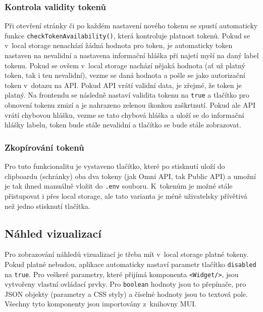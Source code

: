 \documentclass[czech, bc, kiv, he, iso690numb, viewonly]{fasthesis} %
\begin{document}
\subsubsection{Kontrola validity tokenů}

Při otevření stránky či po každém nastavení nového tokenu se spustí automaticky funkce \texttt{checkTokenAvailability()}, která kontroluje platnost tokenů. Pokud se v~local storage nenachází
žádná hodnota pro token, je automaticky token nastaven na nevalidní a nastavena informační hláška při najetí myší na daný label tokenu. Pokud se ovšem v~local storage nachází
nějaká hodnota (ať už platný token, tak i ten nevalidní), vezme se daná hodnota a pošle se jako autorizační token v~dotazu na API. Pokud API vrátí validní data, je zřejmé, že token je platný.
Na frontendu se následně nastaví validita tokenu na \texttt{true} a tlačítko pro obnovení tokenu zmizí a je nahrazeno zelenou ikonkou zaškrtnutí. Pokud ale API vrátí chybovou hlášku, 
vezme se tato chybová hláška a uloží se do informační hlášky labelu, token bude stále nevalidní a tlačítko se bude stále zobrazovat. 

\subsubsection{Zkopírování tokenů}

Pro tuto funkcionalitu je vystaveno tlačítko, které po stisknutí uloží do clipboardu (schránky) oba dva tokeny (jak Omni API, tak Public API) a umožní je tak ihned
manuálně vložit do \texttt{.env} souboru. K~tokenům je možné stále přistupovat i přes local storage, ale tato varianta je méně uživatelsky přívětivá než jedno stisknutí tlačítka.



\subsection{Náhled vizualizací}
Pro zobrazování náhledů vizualizací je třeba mít v~local storage platné tokeny. Pokud platné nebudou, aplikace automaticky nastaví parametr tlačítko
\texttt{disabled} na \texttt{true}. Pro veškeré parametry, které přijímá komponenta \texttt{<Widget/>}, jsou vytvořeny vlastní ovládací prvky.
Pro \texttt{boolean} hodnoty jsou to přepínače, pro JSON objekty (parametry a CSS styly) a číselné hodnoty jsou to textová pole. Všechny tyto komponenty
jsou importovány z~knihovny MUI.
\end{document}
